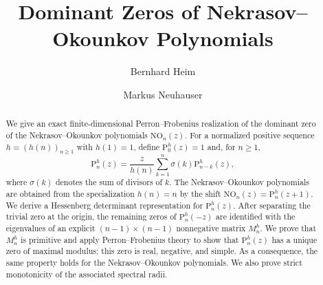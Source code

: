 \documentclass[11pt,reqno]{amsart}
\theoremstyle{plain}
\theoremstyle{remark}
\theoremstyle{definition}
\numberwithin{equation}{section}
\newcommand{\nop}{\mathrm{NO}}
\newcommand{\pol}{\mathrm{P}}
\begin{document}
\title{Dominant Zeros of Nekrasov--Okounkov Polynomials}
\author{Bernhard Heim}
\address{Department of Mathematics and Computer Science\\Division of Mathematics\\University of Cologne\\ Weyertal 86--90 \\ 50931 Cologne \\Germany}
\address{Lehrstuhl A f\"{u}r Mathematik, RWTH Aachen University, 52056 Aachen, Germany}
\author{Markus Neuhauser}
\address{Kutaisi International University, 5/7, Youth Avenue,  Kutaisi, 4600 Georgia}
\address{Lehrstuhl
f\"{u}r Geometrie und
Analysis, RWTH Aachen University, 52056 Aachen, Germany}
\begin{abstract}
We give an exact finite-dimensional Perron--Frobenius realization of the dominant zero of the Nekrasov--Okounkov polynomials $\nop _n(z)$.
For a normalized positive sequence $h=(h(n))_{n\ge 1}$ with $h(1)=1$, define $\pol _0^h(z)=1$ and, for $n\ge 1$,
\[ \pol _n^h(z)=\frac{z}{h(n)}\sum_{k=1}^n \sigma(k)\pol _{n-k}^h(z),\]
where $\sigma(k)$ denotes the sum of divisors of $k$. The Nekrasov--Okounkov polynomials are obtained from the specialization $h(n)=n$ by the shift $\nop _n(z)=\pol _n^h(z+1)$. We derive a Hessenberg determinant representation for $\pol _n^h(z)$. After separating the trivial zero at the origin, the remaining zeros of $\pol _n^h(-z)$ are identified with the eigenvalues of an explicit $(n-1)\times(n-1)$ nonnegative matrix $M_n^h$. We prove that $M_n^h$ is primitive and apply Perron--Frobenius theory to show that $\pol _n^h(z)$ has a unique zero of maximal modulus; this zero is real, negative, and simple. As a consequence, the same property holds for the Nekrasov--Okounkov polynomials. We also prove strict monotonicity of the associated spectral radii.
\end{abstract}
\maketitle
\setcounter{tocdepth}{1}
\end{document}
